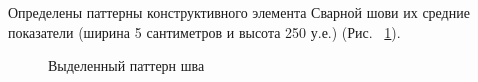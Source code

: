 \documentclass[a4paper,article,14pt]{extarticle}
\begin{document}
Определены паттерны конструктивного элемента \flqq Сварной шов\frqq и их средние показатели 
(ширина 5 сантиметров и высота 250 у.е.) (Рис. ~\ref{image4}).
\pagebreak

\begin{figure}[ht]
    \begin{center}
    
    \caption{
    \label{image4}
    Выделенный паттерн шва}
    \end {center}
\end {figure}

\pagebreak
\end{document}
